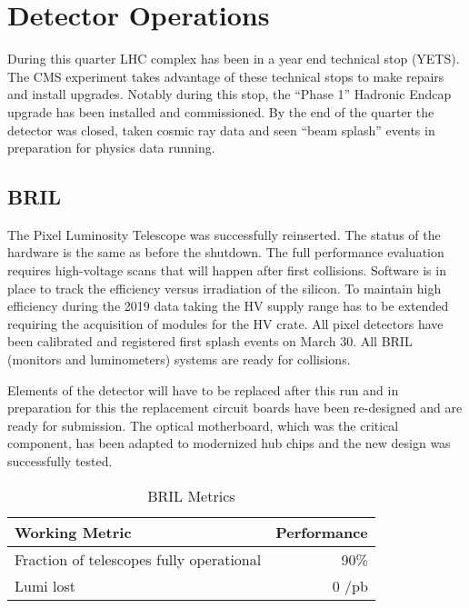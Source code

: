 \documentclass[12pt]{article}
\begin{document}
\section{Detector Operations}
During this quarter LHC complex has been in a year end technical stop (YETS).  The CMS experiment takes advantage of these technical stops to make repairs and install upgrades.   Notably during this stop, the ``Phase 1'' Hadronic Endcap upgrade has been installed and commissioned.   By the end of the quarter the detector was closed, taken cosmic ray data and seen ``beam splash'' events in preparation for physics data running.

\subsection{BRIL }
The Pixel Luminosity Telescope was successfully reinserted.
The status of the hardware is the same as before the shutdown.
The full performance evaluation requires high-voltage scans
that will happen after first collisions. Software is in place
to track the efficiency versus irradiation of the silicon.
To maintain high efficiency during the 2019 data taking the
HV supply range has to be extended requiring the acquisition
of modules for the HV crate.
All pixel detectors have been calibrated and registered first splash 
events on March 30. All BRIL (monitors and luminometers) systems are ready for collisions.

Elements of the detector will have to be replaced after this run and in preparation for this the replacement circuit boards have been re-designed and are ready 
for submission. The optical motherboard, which was the critical 
component, has been adapted to modernized hub chips and the
new design was successfully tested. 


\begin{table}[htp]
\caption{BRIL Metrics}
\begin{center}
\begin{tabular}{|l|r|}
\hline
Working Metric&Performance\\
\hline
Fraction of telescopes fully operational &  90\% \\
\hline
Lumi lost & 0 /pb \\
\hline
\end{tabular}
\end{center}
\label{BRILMetrics}
\end{table}%
\end{document}
